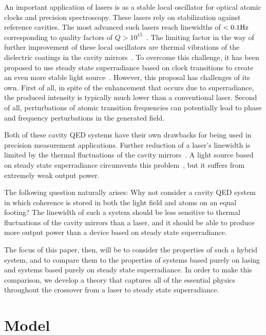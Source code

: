 \documentclass[aps,prl,twocolumn,
superscriptaddress,groupedaddress]{revtex4}
\begin{document}
An important application of lasers is as a stable local oscillator for
optical atomic clocks and precision spectroscopy.  These lasers rely
on stabilization against reference cavities.  The most advanced such
lasers reach linewidths of $< 0.1 {\rm Hz}$ corresponding to quality
factors of $Q>10^{15}$~\cite{Cole:TenfoldReductionBrownianNoise}.  The
limiting factor in the way of further improvement of these local
oscillators are thermal vibrations of the dielectric coatings in the
cavity mirrors~\cite{PhysRevLett.101.260602}.  To overcome this
challenge, it has been proposed to use steady state superradiance based
on clock transitions to create an even more stable light
source~\cite{prospectsofamillihertzlaser,ChenDeliciousLaser}.  However,
this proposal has challenges of its own.  First of all, in spite of the
enhancement that occurs due to superradiance, the produced intensity is
typically much lower than a conventional laser.  Second of all,
perturbations of atomic transition frequencies can potentially lead to
phase and frequency perturbations in the generated field.

Both of these cavity QED systems have their own drawbacks for being
used in precision measurement applications. Further reduction of a
laser's linewidth is limited by the thermal fluctuations of the cavity
mirrors~\cite{PhysRevLett.101.260602}. A light source based on steady
state superradiance circumvents this
problem~\cite{ChenDeliciousLaser}, but it suffers from extremely weak
output power.

The following question naturally arises: Why not consider a cavity QED
system in which coherence is stored in both the light field and atoms
on an equal footing? The linewidth of such a system should be less
sensitive to thermal fluctuations of the cavity mirrors than a laser,
and it should be able to produce more output power than a device based
on steady state superradiance.

The focus of this paper, then, will be to consider the properties of
such a hybrid system, and to compare them to the properties of systems
based purely on lasing and systems based purely on steady state
superradiance. In order to make this comparison, we develop a theory
that captures all of the essential physics throughout the crossover
from a laser to steady state superradiance.

\section{Model}
\end{document}
